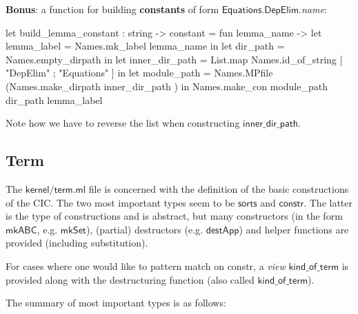 \documentclass[a4paper,oneside]{book}
\newcommand{\m}[1]{\ensuremath{\mathsf{#1}}}
\begin{document}
\noindent
\textbf{Bonus}: a function for building \textbf{constants} of form
\m{Equations.DepElim}.\emph{name}:

\begin{code}
let build_lemma_constant : string -> constant =
  fun lemma_name ->
    let lemma_label = Names.mk_label lemma_name in
    let dir_path = Names.empty_dirpath in
    let inner_dir_path = List.map Names.id_of_string [ "DepElim" ; "Equations" ] in
    let module_path = Names.MPfile (Names.make_dirpath inner_dir_path ) in
    Names.make_con module_path dir_path lemma_label
\end{code}
Note how we have to reverse the list when constructing \m{inner\_dir\_path}.

\subsection{Term}

The \m{kernel/term.ml} file is concerned with the definition of the
basic constructions of the CIC. The two most important types seem to
be \m{sorts} and \m{constr}. The latter is the type of constructions
and is abstract, but many constructors (in the form \m{mkABC},
e.g. \m{mkSet}), (partial) destructors (e.g. \m{destApp}) and helper
functions are provided (including substitution). 

For cases where one would like to pattern match on constr, a
\emph{view} \m{kind\_of\_term} is provided along with the
destructuring function (also called \m{kind\_of\_term}).

The summary of most important types is as follows:
\end{document}
